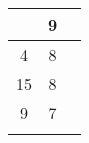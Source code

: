\begin{table}[H]
\begin{tabularx}{\textwidth}{p{.1em}cc}
\begin{tabular}[t]{cc}
\multicolumn{1}{|c|}{11}                                                        & \multicolumn{1}{c|}{9}                                                             \\ \hline
\multicolumn{1}{|c|}{4}                                                        & \multicolumn{1}{c|}{8}                                                             \\ \hline
\multicolumn{1}{|c|}{15}                                                        & \multicolumn{1}{c|}{8}                                                             \\ \hline
\multicolumn{1}{|c|}{9}                                                        & \multicolumn{1}{c|}{7}                                                             \\ \hline
\end{tabular}

\end{tabularx}\end{table}